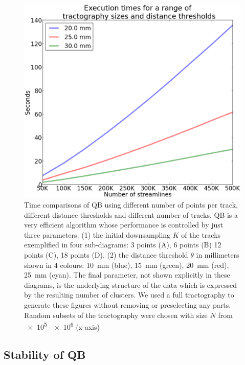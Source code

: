 \documentclass{bioinfo}
\begin{document}
\begin{figure}
\noindent \begin{centering}
\includegraphics[scale=0.23]{Figures/Fig_3_timings}
\par\end{centering}
\caption{Time comparisons of QB using different number of points per
  track, different distance thresholds and different number of
  tracks. QB is a very efficient algorithm whose performance is
  controlled by just three parameters. (1) the initial downsampling $K$
  of the tracks exemplified in four sub-diagrams: 3 points (A), 6 points
  (B) 12 points (C), 18 points (D). (2) the distance threshold $\theta$
  in millimeters shown in 4 colours: 10~mm (blue), 15~mm (green), 20~mm
  (red), 25~mm (cyan). The final parameter, not shown explicitly in
  these diagrams, is the underlying structure of the data which is
  expressed by the resulting number of clusters.  We used a full
  tractography to generate these figures without removing or
  preselecting any parts. Random subsets of the tractography were
  chosen with size $N$ from \numrange{e5}{e6} (x-axis)\label{Flo:Speed1}}
\end{figure}

\subsection{Stability of QB\label{sub:Comparisons}}
\end{document}
